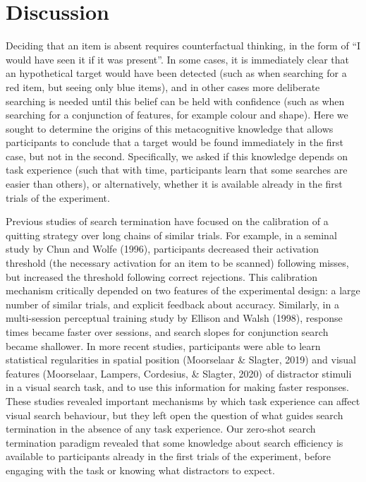 \documentclass[
  english,
  man]{apa6}
\begin{document}
\hypertarget{discussion}{%
\section{Discussion}\label{discussion}}

Deciding that an item is absent requires counterfactual thinking, in the form of \enquote{I would have seen it if it was present}. In some cases, it is immediately clear that an hypothetical target would have been detected (such as when searching for a red item, but seeing only blue items), and in other cases more deliberate searching is needed until this belief can be held with confidence (such as when searching for a conjunction of features, for example colour and shape). Here we sought to determine the origins of this metacognitive knowledge that allows participants to conclude that a target would be found immediately in the first case, but not in the second. Specifically, we asked if this knowledge depends on task experience (such that with time, participants learn that some searches are easier than others), or alternatively, whether it is available already in the first trials of the experiment.

Previous studies of search termination have focused on the calibration of a quitting strategy over long chains of similar trials. For example, in a seminal study by Chun and Wolfe (1996), participants decreased their activation threshold (the necessary activation for an item to be scanned) following misses, but increased the threshold following correct rejections. This calibration mechanism critically depended on two features of the experimental design: a large number of similar trials, and explicit feedback about accuracy. Similarly, in a multi-session perceptual training study by Ellison and Walsh (1998), response times became faster over sessions, and search slopes for conjunction search became shallower. In more recent studies, participants were able to learn statistical regularities in spatial position (Moorselaar \& Slagter, 2019) and visual features (Moorselaar, Lampers, Cordesius, \& Slagter, 2020) of distractor stimuli in a visual search task, and to use this information for making faster responses. These studies revealed important mechanisms by which task experience can affect visual search behaviour, but they left open the question of what guides search termination in the absence of any task experience. Our zero-shot search termination paradigm revealed that some knowledge about search efficiency is available to participants already in the first trials of the experiment, before engaging with the task or knowing what distractors to expect.
\end{document}
